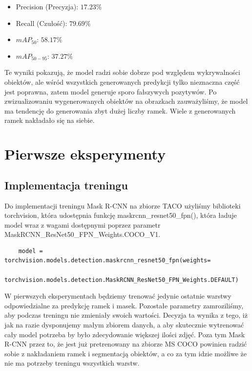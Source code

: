 \documentclass[licencjacka]{pracamgr}
\begin{document}
\begin{itemize}
    \item Precision (Precyzja): $17.23\%$
    \item Recall (Czułość): $79.69\%$
    \item $mAP_{50}$: $58.17\%$
    \item $mAP_{50-95}$: $37.27\%$
\end{itemize}



Te wyniki pokazują, że model radzi sobie dobrze pod względem wykrywalności obiektów, ale wśród wszystkich generowanych predykcji tylko nieznaczna część jest poprawna, zatem model generuje sporo fałszywych pozytywów. Po zwizualizowaniu wygenerowanych obiektów na obrazkach zauważyliśmy, że model ma tendencję do generowania zbyt dużej liczby ramek. Wiele z generowanych ramek nakładało się na siebie.

\section{Pierwsze eksperymenty}
\subsection{Implementacja treningu}
Do implementacji treningu Mask R-CNN na zbiorze TACO użyliśmy biblioteki torchvision, która udostępnia funkcję maskrcnn\_resnet50\_fpn(), która ładuje model wraz z wagami dostępnymi poprzez parametr MaskRCNN\_ResNet50\_FPN\_Weights.COCO\_V1.


\begin{verbatim}
    model = torchvision.models.detection.maskrcnn_resnet50_fpn(weights=
    torchvision.models.detection.MaskRCNN_ResNet50_FPN_Weights.DEFAULT)

\end{verbatim}
W pierwszych eksperymentach będziemy trenować jedynie ostatnie warstwy odpowiedzialne za predykcję ramek i masek. Pozostałe parametry zamroziliśmy, aby podczas treningu nie zmieniały swoich wartości. Decyzja ta wynika z tego, iż jak na razie dysponujemy małym zbiorem danych, a aby skutecznie wytrenować cały model potrzeba by było zdecydowanie większej ilości zdjęć. Poza tym Mask R-CNN przez to, że jest już pretrenowany na zbiorze MS COCO powinien radzić sobie z nakładaniem ramek i segmentacją obiektów, a co za tym idzie możliwe że nie ma potrzeby treningu wszystkich warstw. %
\end{document}
